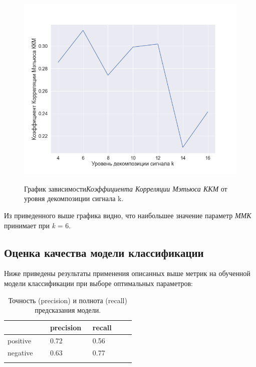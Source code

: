 \documentclass[utf8x, 14pt, oneside, a4paper]{article}
\begin{document}
	
	\begin{figure}[h!]
		\begin{center}
			{\includegraphics[scale = 0.55]{img/KKM(k).png}}
		\end{center}
		\caption{График зависимости\textit{Коэффициента Корреляции Мэтьюса ККМ} от уровня декомпозиции сигнала k.}
		\label{ris:auc(n_frame)}
	\end{figure}
	
	Из приведенного выше графика видно, что наибольшее значение параметр \textit{ММК} принимает при \textit{k} = 6.
	
	\subsection{Оценка качества модели классификации}
	
	Ниже приведены результаты применения описанных выше метрик на обученной модели классификации при выборе оптимальных параметров:
	
	\begin{center}
		\begin{longtable}[h!]{|p{0.3\linewidth}|p{0.3\linewidth}|p{0.3\linewidth}|}
			\hline
			{} & {precision} & {recall}\\
			\hline
			{positive} & {0.72} & {0.56}\\
			\hline
			{negative} & {0.63} & {0.77}\\
			\hline
			\caption{Точность (precision) и полнота (recall) предсказания модели.}
		\end{longtable}
	\end{center}
\end{document}
